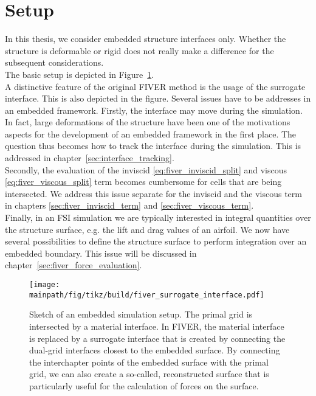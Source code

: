 \documentclass[../main.tex]{subfiles}
\begin{document}
\section{Setup}\label{sec:fiver_setup}
In this thesis, we consider embedded structure interfaces only. Whether the structure is deformable or rigid does not really make a difference for the subsequent considerations.\\
The basic setup is depicted in Figure~\ref{fig:FIVER_interchapter}.\\
A distinctive feature of the original \ac{FIVER} method is the usage of the surrogate interface. This is also depicted in the figure.
Several issues have to be addresses in an embedded framework. Firstly, the interface may move during the simulation. In fact, large deformations of the structure have been one of the motivations aspects for the development of an embedded framework in the first place. The question thus becomes how to track the interface during the simulation. This is addressed in chapter~\ref{sec:interface_tracking}.\\
Secondly, the evaluation of the inviscid \eqref{eq:fiver_inviscid_split} and viscous \eqref{eq:fiver_viscous_split} term becomes cumbersome for cells that are being intersected. We address this issue separate for the inviscid and the viscous term in chapters \ref{sec:fiver_inviscid_term} and \ref{sec:fiver_viscous_term}.\\
Finally, in an \ac{FSI} simulation we are typically interested in integral quantities over the structure surface, e.g. the lift and drag values of an airfoil. We now have several possibilities to define the structure surface to perform integration over an embedded boundary. This issue will be discussed in chapter~\ref{sec:fiver_force_evaluation}.

\begin{figure}[h!]
	\begin{center}
        \texttt{[image: \\mainpath/fig/tikz/build/fiver\_surrogate\_interface.pdf]}
        \caption[Immersed boundary method via \ac{FIVER}: setup]{Sketch of an embedded simulation setup. The primal grid is intersected by a material interface. In \ac{FIVER}, the material interface is replaced by a surrogate interface that is created by connecting the dual-grid interfaces closest to the embedded surface. By connecting the interchapter points of the embedded surface with the primal grid, we can also create a so-called, reconstructed surface that is particularly useful for the calculation of forces on the surface.}
		\label{fig:FIVER_interchapter}
    \end{center}
\end{figure}
\end{document}
